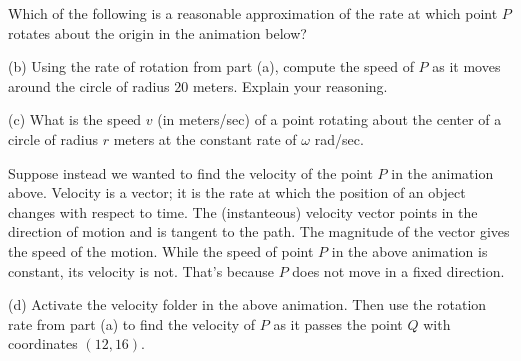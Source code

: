 \documentclass{ximera}
\begin{document}
\begin{exploration}  \label{Qdstsdfgf:Cross}

\begin{question}   \label{Qdfg4bk:Cross}
Which of the following is a reasonable approximation of the rate at which point $P$ rotates about the origin in the animation below?
\begin{multipleChoice}  
\end{multipleChoice}  
\end{question}


(b) Using the rate of rotation from part (a), compute the speed of $P$ as it moves around the circle of radius $20$ meters. Explain your reasoning.

(c) What is the speed $v$ (in meters/sec) of a point rotating about the center of a circle of radius $r$ meters at the constant rate of $\omega$ rad/sec.

 
\begin{onlineOnly}
    \begin{center}
\end{center}
\end{onlineOnly}


Suppose instead we wanted to find the velocity of the point $P$ in the animation above. Velocity is a vector; it is the rate at which the position of an object changes with respect to time. The (instanteous) velocity vector points in the direction of motion and is  tangent to the path. The magnitude of the vector gives the speed of the motion. While the speed of point $P$ in the above animation is constant, its velocity is not. That's because $P$ does not move in a fixed direction.

\begin{question}   \label{Q3456457l:Cross}
(d) Activate the velocity folder in the above animation. Then use the rotation rate from part (a) to find the velocity of $P$ as it passes the point $Q$ with coordinates $(12,16)$.
\end{question}

\end{exploration}
\end{document}
